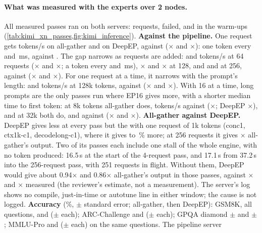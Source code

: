 \paragraph{What was measured with the experts over 2 nodes.} All \TriKxnPasses{} measured passes ran on both servers: \TriKxnRequests{} requests, \TriKxnFailed{} failed, and \TriKxnWarmFailed{} in the warm-ups (\cref{tab:kimi_xn_passes,fig:kimi_inference}). \textbf{Against the pipeline.} One request gets \TriKxnOneTokAg{} tokens/s on all-gather and \TriKxnOneTokDp{} on DeepEP, against \TriKimiOneTok{} (\TriKxnOneRatioAg$\times$ and \TriKxnOneRatioDp$\times$): one token every \TriKxnOneTpotAg{} and \TriKxnOneTpotDp\,ms, against \TriKimiOneTpot. The gap narrows as requests are added: \TriKxnSixtyFourTokAg{} and \TriKxnSixtyFourTokDp{} tokens/s at 64 requests (\TriKxnSixtyFourRatioAg$\times$ and \TriKxnSixtyFourRatioDp$\times$; a token every \TriKxnSixtyFourTpotAg{} and \TriKxnSixtyFourTpotDp\,ms), \TriKxnOneTwentyEightRatioAg$\times$ and \TriKxnOneTwentyEightRatioDp$\times$ at 128, and \TriKxnTwoFiftySixTokAg{} and \TriKxnTwoFiftySixTokDp{} at 256, against \TriKxnTwoFiftySixTokPp{} (\TriKxnTwoFiftySixRatioAg$\times$ and \TriKxnTwoFiftySixRatioDp$\times$). For one request at a time, it narrows with the prompt's length: \TriKxnCtxTokAg{} and \TriKxnCtxTokDp{} tokens/s at 128k tokens, against \TriKimiCtxTok{} (\TriKxnCtxRatioAg$\times$ and \TriKxnCtxRatioDp$\times$). With 16 at a time, long prompts are the only passes run where EP16 gives more, with a shorter median time to first token: at 8k tokens all-gather does, \TriKxnCtxEightSixteenTokAg{} tokens/s against \TriKxnCtxEightSixteenTokPp{} (\TriKxnCtxEightSixteenRatioAg$\times$; DeepEP \TriKxnCtxEightSixteenRatioDp$\times$), and at 32k both do, \TriKxnCtxThirtyTwoSixteenTokAg{} and \TriKxnCtxThirtyTwoSixteenTokDp{} against \TriKimiCtxSixteenTokThirtyTwo{} (\TriKxnCtxThirtyTwoSixteenRatioAg$\times$ and \TriKxnCtxThirtyTwoSixteenRatioDp$\times$). \textbf{All-gather against DeepEP.} DeepEP gives less at every pass but the \TriKxnDpLeadN{} with one request of 1k tokens (conc1, ctx1k-c1, decodelong-c1), where it gives \TriKxnDpLeadLo{} to \TriKxnDpLeadHi\,\% more; at 256 requests it gives \TriKxnDpAgTwoFiftySix$\times$ all-gather's output. Two of its passes each include one stall of the whole engine, with no token produced: 16.5\,s at the start of the 4-request pass, and 17.1\,s from 37.2\,s into the 256-request pass, with 251 requests in flight. Without them, DeepEP would give about 0.94$\times$ and 0.86$\times$ all-gather's output in those passes, against \TriKxnDpAgFour$\times$ and \TriKxnDpAgTwoFiftySix$\times$ measured (the reviewer's estimate, not a measurement). The server's log shows no compile, just-in-time or autotune line in either window; the cause is not logged. \textbf{Accuracy} (\%, $\pm$ standard error; all-gather, then DeepEP): GSM8K, all \TriKxnGsmN{} questions, \TriKxnGsmAg{} and \TriKxnGsmDp{} ($\pm$ \TriKxnGsmErrAg{} each); ARC-Challenge \TriKxnArcAg{} and \TriKxnArcDp{} ($\pm$ \TriKxnArcErrAg{} each); GPQA diamond \TriKxnGpqaAg{} $\pm$ \TriKxnGpqaErrAg{} and \TriKxnGpqaDp{} $\pm$ \TriKxnGpqaErrDp; MMLU-Pro \TriKxnMmluAg{} and \TriKxnMmluDp{} ($\pm$ \TriKxnMmluErrAg{} each) on the same \TriKimiMmluN{} questions. The pipeline server 